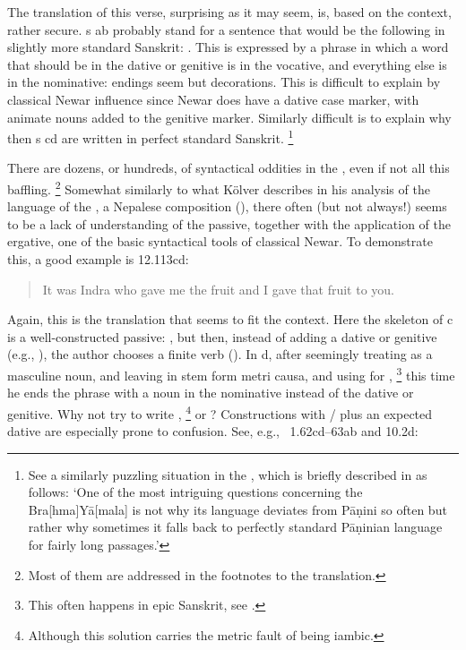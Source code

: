 \noindent            
The translation of this verse, surprising as it may seem, is, based on the
context, rather secure. s ab probably stand for a sentence that would
be the following in slightly more standard Sanskrit:
.
This is expressed by a phrase in which a word that should be 
in the dative or genitive  is in the vocative, and  
everything else is in the nominative: endings seem but
decorations. This is difficult to explain by classical Newar influence since Newar
does have a dative case marker, with animate nouns added to the genitive
marker. Similarly difficult is to explain why then s cd
are written in perfect standard Sanskrit.%
		\footnote{See a similarly puzzling situation in the \BraYa, 
						which is briefly described in  as follows:
		`One of the most intriguing questions concerning the Bra[hma]Yā[mala] 
		is not why its language deviates from Pāṇini so often 
		but rather why sometimes it falls back to perfectly standard 
		Pāṇinian language for fairly long passages.'}

There are dozens, or hundreds, of syntactical oddities in the \VSS,
even if not all this baffling.%
		\footnote{Most of them are addressed in the footnotes 
									to the translation.}
Somewhat similarly to what Kölver describes in 
his analysis of the language of the \SvayP, a Nepalese composition (),
there often (but not always!) seems to be a lack of understanding of the
passive, together with the application of the ergative, one of the
basic syntactical tools of classical Newar. To demonstrate this, a good 
example is 12.113cd:

\begin{quote}

It was Indra who gave me the fruit and I gave that fruit to you.
\end{quote}

\noindent
Again, this is the translation that seems to fit the context. 
Here the skeleton of  c is a well-constructed passive:
, but then, instead of adding a dative or 
genitive (e.g., ), the author chooses 
a finite verb (). In  d, after seemingly 
treating  as a masculine noun, and leaving
 in stem form metri causa, and using  for ,%
		\footnote{This often happens in epic Sanskrit, see 
			.}
this time he ends the phrase with a noun in the nominative  instead of
the dative or genitive. Why not try to write ,%
		\footnote{Although this solution carries the metric fault of 
								being iambic.}
or ?
Constructions with / plus an expected dative 
are especially prone to confusion. See, e.g., \VSS\ 1.62cd--63ab and 
10.2d:

